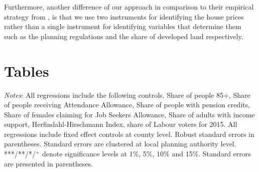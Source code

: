 \documentclass[12pt,letterpaper]{article}
\begin{document}
Furthermore, another difference of our approach in comparison to their empirical strategy from \citet{hilber2016supply}, is that we use two instruments for 
identifying the house prices rather than a single instrument for identifying variables that determine them such as the 
planning regulations and the share of developed land respectively.
 
\section{Tables}

\begin{table}[h]
\centering
\caption{First stage results, dependent variable house prices (log)}
\label{table first_stage}
\begin{tablenotes}
      \scriptsize
      \item {\it{Notes}}: All regressions include the following controls. Share of people 85+, 
      Share of people receiving Attendance Allowance, Share of people with pension credits, 
      Share of females claiming for Job Seekers Allowance, Share of adults with income 
      support, 
      Herfindahl-Hirschmann Index, share of Labour voters for 2015. All regressions include fixed effect controls at
      county level. Robust standard errors in parentheses. Standard errors are clustered at local planning 
      authority level. ***/**/*/$^{+}$ denote significance levels at 1\%, 5\%, 
      10\% and 15\%. Standard errors are presented in parentheses. 
    \end{tablenotes}
\end{table}


\newpage


%
\newpage
\end{document}

